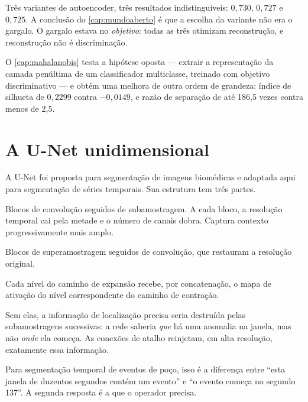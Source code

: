 \begin{destaque}
Três variantes de autoencoder, três resultados indistinguíveis: $0{,}730$, $0{,}727$ e
$0{,}725$. A conclusão do \cref{cap:mundoaberto} é que a escolha da variante não era o
gargalo. O gargalo estava no \emph{objetivo}: todas as três otimizam reconstrução, e
reconstrução não é discriminação.

O \cref{cap:mahalanobis} testa a hipótese oposta --- extrair a representação da camada
penúltima de um classificador multiclasse, treinado com objetivo discriminativo --- e
obtém uma melhora de outra ordem de grandeza: índice de silhueta de $0{,}2299$ contra
$-0{,}0149$, e razão de separação de até 186,5 vezes contra menos de 2,5.
\end{destaque}

\section{A U-Net unidimensional}

A U-Net \citep{Ronneberger2015} foi proposta para segmentação de imagens biomédicas e
adaptada aqui para segmentação de séries temporais. Sua estrutura tem três partes.

\begin{description}[leftmargin=0pt,style=nextline,itemsep=0.4em]

\item[Caminho de contração.] Blocos de convolução seguidos de subamostragem. A cada
bloco, a resolução temporal cai pela metade e o número de canais dobra. Captura contexto
progressivamente mais amplo.

\item[Caminho de expansão.] Blocos de superamostragem seguidos de convolução, que
restauram a resolução original.

\item[Conexões de atalho.] Cada nível do caminho de expansão recebe, por concatenação, o
mapa de ativação do nível correspondente do caminho de contração.

\end{description}

\begin{destaque}
Sem elas, a informação de localização precisa seria destruída pelas subamostragens
sucessivas: a rede saberia \emph{que} há uma anomalia na janela, mas não \emph{onde} ela
começa. As conexões de atalho reinjetam, em alta resolução, exatamente essa informação.

Para segmentação temporal de eventos de poço, isso é a diferença entre ``esta janela de
duzentos segundos contém um evento'' e ``o evento começa no segundo 137''. A segunda
resposta é a que o operador precisa.
\end{destaque}

